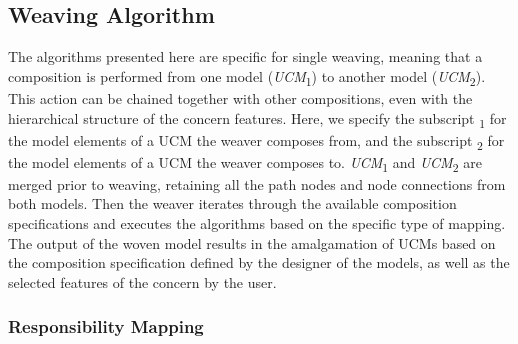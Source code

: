 \subsection{Weaving Algorithm}

The algorithms presented here are specific for single weaving, meaning that a composition is performed from one model (\emph{UCM}\textsubscript{1}) to another model (\emph{UCM}\textsubscript{2}). This action can be chained together with other compositions, even with the hierarchical structure of the concern features. Here, we specify the subscript \textsubscript{1} for the model elements of a UCM the weaver composes from, and the subscript \textsubscript{2} for the model elements of a UCM the weaver composes to. \emph{UCM}\textsubscript{1} and \emph{UCM}\textsubscript{2} are merged prior to weaving, retaining all the path nodes and node connections from both models. Then the weaver iterates through the available composition specifications and executes the algorithms based on the specific type of mapping. The output of the woven model results in the amalgamation of UCMs based on the composition specification defined by the designer of the models, as well as the selected features of the concern by the user.

\subsubsection{Responsibility Mapping} \label{sec:3.2.1.1}

